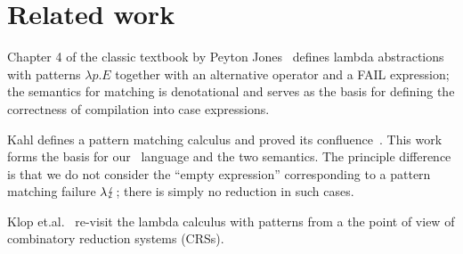 
\section{Related work}

Chapter 4 of the classic textbook by Peyton Jones~\cite{spj_1987}
defines lambda abstractions with patterns $\lambda p.E$ together with an
alternative operator and a FAIL expression; the semantics for
matching is denotational and serves as the basis for defining
the correctness of compilation into case expressions.

Kahl defines a pattern matching calculus and proved
its confluence~\cite{kahl_2004}. This work forms the basis for our \lambdaPMC\
language and the two semantics. The principle difference is that
we do not consider the ``empty expression'' corresponding
to a pattern matching failure $\lambda\lightning$;
there is simply no reduction in such cases.

Klop et.\@ al.\@~\cite{KLOP200816} re-visit the lambda calculus with
patterns from a the point of view of combinatory reduction systems
(CRSs).


